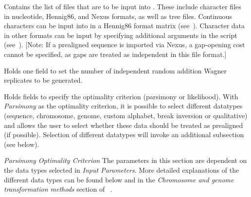 \begin{description}
\setlength{\parindent}{0.5cm}
    \item[Input Files]
       	 Contains the list of files that are to be input into \poy. These include
       	character files in nucleotide, Hennig86, and Nexus formats, as well as tree files. 
	Continuous characters can be input into \poy in a Hennig86 format matrix (see~).
       	Character data in other formats can be input by specifying additional arguments in the script (see~).
		 [Note: If a prealigned sequence is imported via Nexus, a gap-opening cost cannot be specified, 
	 as gaps are treated as independent in this file format.]
    
    \item[Search Parameters]
        	Holds one field to set the number of independent random addition Wagner replicates to be generated.
    
    \item[Input Parameters]
    	Holds fields to specify the optimality criterion (parsimony or likelihood).  With \emph{Parsimony} 
	as the optimality criterion, it is possible to select different datatypes (sequence, chromosome, genome, 
	custom alphabet, break inversion or qualitative) and allows the user to select whether these data 
	should be treated as prealigned (if possible). Selection of different datatypes will invoke an additional 
	subsection (see below).
\end{description}   

       \hangindent=1cm	\emph{Parsimony Optimality Criterion}
        The parameters in this section are dependent on the data types selected 
        in \emph{Input Parameters}. More detailed explanations of the different data types can be found 
        below and in the \emph{Chromosome and genome transformation methods} section of  ~.

